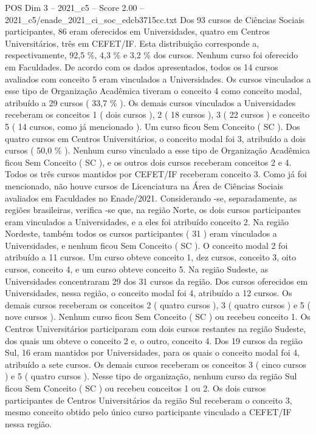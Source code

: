 \begin{textsample}{POS Dim 3 – 2021\_c5 – Score 2.00 – 2021\_c5/enade\_2021\_ci\_soc\_edcb3715cc.txt}
Dos 93 cursos de Ciências Sociais participantes, 86 eram oferecidos em Universidades, quatro em Centros Universitários, três em CEFET/IF.
Esta distribuição corresponde a, respectivamente, 92,5 \%, 4,3 \% e 3,2 \% dos cursos.
Nenhum curso foi oferecido em Faculdades.
De acordo com os dados apresentados, todos os 14 cursos avaliados com conceito 5 eram vinculados a Universidades.
Os cursos vinculados a esse tipo de Organização Acadêmica tiveram o conceito 4 como conceito modal, atribuído a 29 cursos ( 33,7 \% ).
Os demais cursos vinculados a Universidades receberam os conceitos 1 ( dois cursos ), 2 ( 18 cursos ), 3 ( 22 cursos ) e conceito 5 ( 14 cursos, como já mencionado ).
Um curso ficou Sem Conceito ( SC ).
Dos quatro cursos em Centros Universitários, o conceito modal foi 3, atribuído a dois cursos ( 50,0 \% ).
Nenhum curso vinculado a esse tipo de Organização Acadêmica ficou Sem Conceito ( SC ), e os outros dois cursos receberam conceitos 2 e 4.
Todos os três cursos mantidos por CEFET/IF receberam conceito 3.
Como já foi mencionado, não houve cursos de Licenciatura na Área de Ciências Sociais avaliados em Faculdades no Enade/2021.
Considerando -se, separadamente, as regiões brasileiras, verifica -se que, na região Norte, os dois cursos participantes eram vinculados a Universidades, e a eles foi atribuído conceito 2.
Na região Nordeste, também todos os cursos participantes ( 31 ) eram vinculados a Universidades, e nenhum ficou Sem Conceito ( SC ).
O conceito modal 2 foi atribuído a 11 cursos.
Um curso obteve conceito 1, dez cursos, conceito 3, oito cursos, conceito 4, e um curso obteve conceito 5.
Na região Sudeste, as Universidades concentraram 29 dos 31 cursos da região.
Dos cursos oferecidos em Universidades, nessa região, o conceito modal foi 4, atribuído a 12 cursos.
Os demais cursos receberam os conceitos 2 ( quatro cursos ), 3 ( quatro cursos ) e 5 ( nove cursos ).
Nenhum curso ficou Sem Conceito ( SC ) ou recebeu conceito 1.
Os Centros Universitários participaram com dois cursos restantes na região Sudeste, dos quais um obteve o conceito 2 e, o outro, conceito 4.
Dos 19 cursos da região Sul, 16 eram mantidos por Universidades, para os quais o conceito modal foi 4, atribuído a sete cursos.
Os demais cursos receberam os conceitos 3 ( cinco cursos ) e 5 ( quatro cursos ).
Nesse tipo de organização, nenhum curso da região Sul ficou Sem Conceito ( SC ) ou recebeu conceitos 1 ou 2.
Os dois cursos participantes de Centros Universitários da região Sul receberam o conceito 3, mesmo conceito obtido pelo único curso participante vinculado a CEFET/IF nessa região.

\end{textsample}
